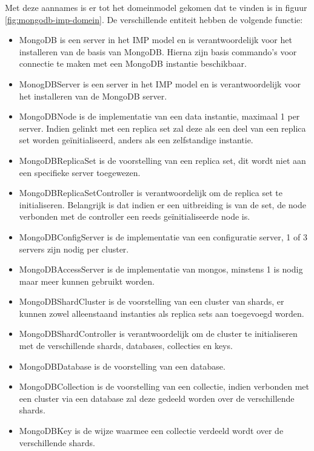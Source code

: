 Met deze aannames is er tot het domeinmodel gekomen dat te vinden is in figuur \ref{fig:mongodb-imp-domein}. De verschillende entiteit hebben de volgende functie:
\begin{itemize}
	\item MongoDB is een server in het IMP model en is verantwoordelijk voor het installeren van de basis van MongoDB. Hierna zijn basis commando's voor connectie te maken met een MongoDB instantie beschikbaar. 
	\item MonogDBServer is een server in het IMP model en is verantwoordelijk voor het installeren van de MongoDB server. 
	\item MongoDBNode is de implementatie van een data instantie, maximaal 1 per server. Indien gelinkt met een replica set zal deze als een deel van een replica set worden geïnitialiseerd, anders als een zelfstandige instantie. 
	\item MongoDBReplicaSet is de voorstelling van een replica set, dit wordt niet aan een specifieke server toegewezen. 
	\item MongoDBReplicaSetController is verantwoordelijk om de replica set te initialiseren. Belangrijk is dat indien er een uitbreiding is van de set, de node verbonden met de controller een reeds geïnitialiseerde node is.  
	\item MongoDBConfigServer is de implementatie van een configuratie server, 1 of 3 servers zijn nodig per cluster. 
	\item MongoDBAccessServer is de implementatie van mongos, minstens 1 is nodig maar meer kunnen gebruikt worden.
	\item MongoDBShardCluster is de voorstelling van een cluster van shards, er kunnen zowel alleenstaand instanties als replica sets aan toegevoegd worden. 
	\item MongoDBShardController is verantwoordelijk om de cluster te initialiseren met de verschillende shards, databases, collecties en keys. 
	\item MongoDBDatabase is de voorstelling van een database.
	\item MongoDBCollection is de voorstelling van een collectie, indien verbonden met een cluster via een database zal deze gedeeld worden over de verschillende shards. 
	\item MongoDBKey is de wijze waarmee een collectie verdeeld wordt over de verschillende shards. 
\end{itemize}
